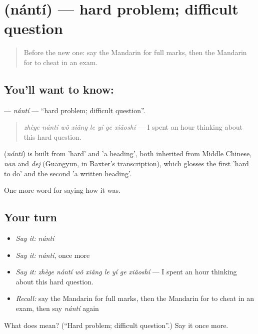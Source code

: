 \section[\texorpdfstring{\zh{难题} (nántí)}{难题 (nántí)}]{ (nántí) — hard problem; difficult question}

\label{lesson:ZH-C495-nanti}



\begin{quote}
Before the new one: say the Mandarin for full marks, then the Mandarin for to cheat in an exam.
\end{quote}

\subsection*{You'll want to know: }
\textbf{} — \emph{nántí} — \textquotedblleft{}hard problem; difficult question\textquotedblright{}.

\begin{quote}
\textbf{} \emph{zhège nántí wǒ xiǎng le yí ge xiǎoshí} — I spent an hour thinking about this hard question.
\end{quote}

\begin{cousinweb}
\textbf{} (\emph{nántí}) is built from  'hard' and  'a heading', both inherited from Middle Chinese, \emph{nan} and \emph{dej} (Guangyun, in Baxter's transcription), which glosses the first 'hard to do' and the second 'a written heading'.
\end{cousinweb}

\begin{grammarlens}[title={What you've built}]
One more word for saying how it was.
\end{grammarlens}

\subsection*{Your turn}
\begin{itemize}
\raggedright
  \item \emph{Say it:} \emph{nántí}
  \item \emph{Say it:} \emph{nántí}, once more
  \item \emph{Say it:} \emph{zhège nántí wǒ xiǎng le yí ge xiǎoshí} — I spent an hour thinking about this hard question.
  \item \emph{Recall:} say the Mandarin for full marks, then the Mandarin for to cheat in an exam, then say \emph{nántí} again
\end{itemize}

\begin{tcolorbox}[breakable,colback=teal!4,colframe=teal!35!black,title={Before you move on}]
What does  mean? (\textquotedblleft{}Hard problem; difficult question\textquotedblright{}.) Say it once more.
\end{tcolorbox}
